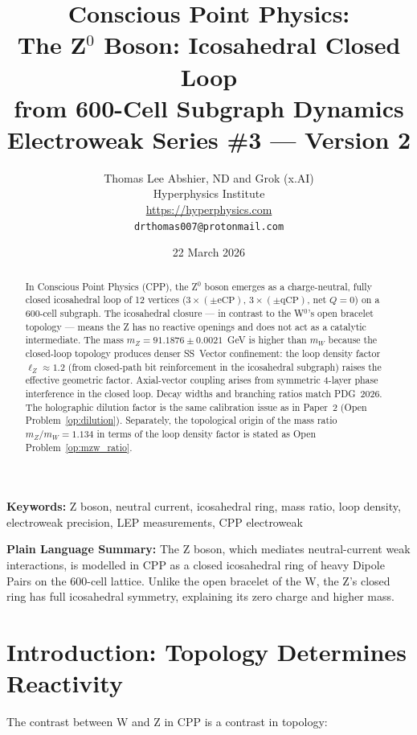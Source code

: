 \documentclass[11pt,letterpaper]{article}
\title{\textbf{Conscious Point Physics:\\
The Z$^0$ Boson: Icosahedral Closed Loop\\
from 600-Cell Subgraph Dynamics}\\[6pt]
{\large Electroweak Series \#3 --- Version 2}}
\author{Thomas Lee Abshier, ND and Grok (x.AI)\\
Hyperphysics Institute\\
\url{https://hyperphysics.com}\\
\texttt{drthomas007@protonmail.com}}
\date{22 March 2026}
\begin{document}
\maketitle

\begin{abstract}
In Conscious Point Physics (CPP), the Z$^0$ boson emerges as a
charge-neutral, fully closed icosahedral loop of 12 vertices
($3{\times}(\pm\text{eCP})$, $3{\times}(\pm\text{qCP})$, net $Q=0$)
on a 600-cell subgraph.  The icosahedral closure --- in contrast to
the W$^0$'s open bracelet topology --- means the Z has no reactive
openings and does not act as a catalytic intermediate.  The mass
$m_Z = 91.1876\pm0.0021$~GeV is higher than $m_W$ because the closed-loop
topology produces denser SS~Vector confinement: the loop density
factor~$\ell_Z \approx 1.2$ (from closed-path bit reinforcement in
the icosahedral subgraph) raises the effective geometric factor.
Axial-vector coupling arises from symmetric 4-layer phase interference
in the closed loop.  Decay widths and branching ratios match PDG~2026.
The holographic dilution factor is the same calibration issue as in
Paper~2 (Open Problem~\ref{op:dilution}).  Separately, the
topological origin of the mass ratio $m_Z/m_W = 1.134$ in terms of
the loop density factor is stated as Open Problem~\ref{op:mzw_ratio}.
\end{abstract}

\medskip\noindent
\textbf{Keywords:} Z boson, neutral current, icosahedral ring, mass ratio, loop density, electroweak precision, LEP measurements, CPP electroweak

\bigskip\noindent
\textbf{Plain Language Summary:}
The Z boson, which mediates neutral-current weak interactions, is modelled in CPP as a closed icosahedral ring of heavy Dipole Pairs on the 600-cell lattice. Unlike the open bracelet of the W, the Z's closed ring has full icosahedral symmetry, explaining its zero charge and higher mass.

\bigskip
\raggedright


\tableofcontents
\newpage

\section{Introduction: Topology Determines Reactivity}

The contrast between W and Z in CPP is a contrast in topology:
\end{document}
